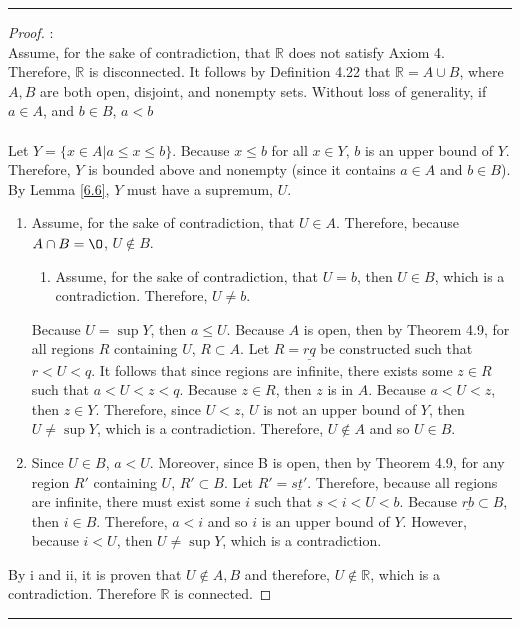 \documentclass[openany, amssymb, psamsfonts]{amsart}
\newcommand{\bbR}{\mathbb{R}}
\renewcommand{\emptyset}{\O}
\theoremstyle{definition}
\numberwithin{equation}{section}
\begin{document}
\vspace{4pt}     \hrule   \vspace{4pt} \begin{proof} :\\
Assume, for the sake of contradiction, that $\bbR$ does not satisfy Axiom 4. Therefore, $\bbR$ is disconnected. It follows by Definition 4.22 that $\bbR = A\cup B$, where $A,B$ are both open, disjoint, and nonempty sets. Without loss of generality, if $a\in A$, and $b\in B$, $a<b$\\\\
Let $Y= \{x\in A | a\leq x \leq b\}$. Because $x\leq b$ for all $x\in Y$, $b$ is an upper bound of $Y$. Therefore, $Y$ is bounded above and nonempty (since it contains $a\in A$ and $b\in B$). By Lemma \ref{6.6}, $Y$ must have a supremum, $U$. 
\begin{enumerate} [i]
\item Assume, for the sake of contradiction, that $U\in A$. Therefore, because $A\cap B = \emptyset$, $U\notin B$. 
\begin{enumerate}
\item Assume, for the sake of contradiction, that $U = b$, then $U\in B$, which is a contradiction. Therefore, $U \neq b$.
\end{enumerate}
 Because $U = \sup Y$, then $a\leq U$. Because $A$ is open, then by Theorem 4.9, for all regions $R$ containing $U$, $R\subset A$. Let $R = \underline{rq}$ be constructed such that $r<U<q$. It follows that since regions are infinite, there exists some $z\in R$ such that $a<U<z<q$. Because $z\in R$, then $z$ is in $A$. Because $a<U<z$, then $z\in Y$. Therefore, since $U<z$, $U$ is not an upper bound of $Y$, then $U \neq \sup Y$, which is a contradiction. Therefore, $U\notin A$ and so $U\in B$.
\item Since $U\in B$, $a<U$. Moreover, since B is open, then by Theorem 4.9, for any region $R'$ containing $U$, $R' \subset B$. Let $R' = \underline{st'}$. Therefore, because all regions are infinite, there must exist some $i$ such that $s<i<U<b$. Because $\underline{rb} \subset B$, then $i\in B$. Therefore, $a<i$ and so $i$ is an upper bound of $Y$. However, because $i<U$, then $U \neq \sup Y$, which is a contradiction. 
\end{enumerate}
By i and ii, it is proven that $U\notin A,B$ and therefore, $U\notin \bbR$, which is a contradiction. Therefore $\bbR$ is connected.
\end{proof} \vspace{4pt}     \hrule   \vspace{4pt}
\end{document}
